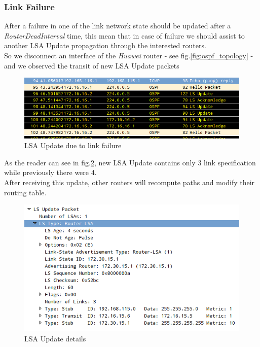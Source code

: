 \documentclass{llncs}
\begin{document}
\subsubsection{Link Failure}

After a failure in one of the link network state should be updated after a \emph{RouterDeadInterval} time, this mean that in case of failure we should assist to another LSA Update propagation through the interested routers.\\
So we disconnect an interface of the \emph{Huawei} router - see fig.\ref{fig:ospf_topology} - and we observed the transit of new LSA Update packets
\begin{figure}
\centering
\includegraphics[width=1.0\textwidth]{../e1/caduta_connessione_lsaupdate.png}
\caption{LSA Update due to link failure}
\label{fig:caduta_connessione_lsaupdate}
\end{figure}

As the reader can see in fig.\ref{fig:lsa update after failure}, new LSA Update contains only 3 link specification while previously there were 4.\\
After receiving this update, other routers will recompute paths and modify their routing table.

\begin{figure}
\centering
\includegraphics[width=1.0\textwidth]{../e1/lsa_update_after_failure.png}
\caption{LSA Update details}
\label{fig:lsa update after failure}
\end{figure}
\end{document}
